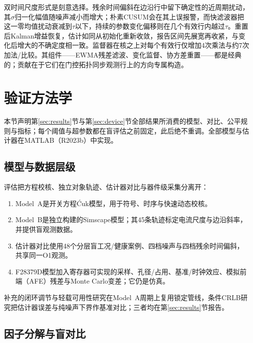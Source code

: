 \documentclass[zihao=5,a4paper]{ctexart}
\DeclareRobustCommand{\Cuk}{\mbox{\'{C}uk}}
\begin{document}
双时间尺度形式是刻意选择。残余时间偏斜在边沿行中留下确定性的近周期扰动，其$\sigma$归一化幅值随噪声减小而增大；朴素CUSUM会在其上误报警，而快滤波器把这一零均值扰动衰减到$\tau$以下，持续的参数变化偏移则在几个有效行内越过$\tau$。重置后Kalman增益恢复，估计如同从初始化重新收敛，报告区间先展宽再收紧，与变化后增大的不确定度相一致。监督器在核之上对每个有效行仅增加4次乘法与约7次加法/比较。其组件——EWMA残差滤波、变化监督、协方差重置——都是经典的\cite{page1954cusum,mehra1970adaptive,willsky1976survey,gustafsson2000adaptive}；贡献在于它们在门控拓扑同步观测行上的方向专属构造。

\section{验证方法学}
\label{sec:protocol}

本节声明第\ref{sec:results}节与第\ref{sec:device}节全部结果所消费的模型、对比、公平规则与指标；每个阈值与超参数都在盲评估之前固定，此后绝不重调。全部模型与估计器在MATLAB（R2023b）中实现。

\subsection{模型与数据层级}

评估把方程校核、独立对象轨迹、估计器对比与器件级采集分离开：
\begin{enumerate}
\item Model~A是开关方程\Cuk{}模型，用于符号、时序与快速动态校核。
\item Model~B是独立构建的Simscape模型；其45条轨迹标定电流尺度与边沿斜率，并提供盲观测数据。
\item 估计器对比使用48个分层盲工况/健康案例、四档噪声与四档残余时间偏斜，共享同一O1观测。
\item F28379D模型加入寄存器可实现的采样、孔径/占用、基准/时钟效应、模拟前端（AFE）残差与Monte Carlo变差；它仍是仿真。
\end{enumerate}
补充的闭环调节与轻载可用性研究在Model~A周期上复用锁定管线，条件CRLB研究把估计器误差与纯噪声下界作基准对比；三者均在第\ref{sec:results}节报告。

\subsection{因子分解与盲对比}
\end{document}
